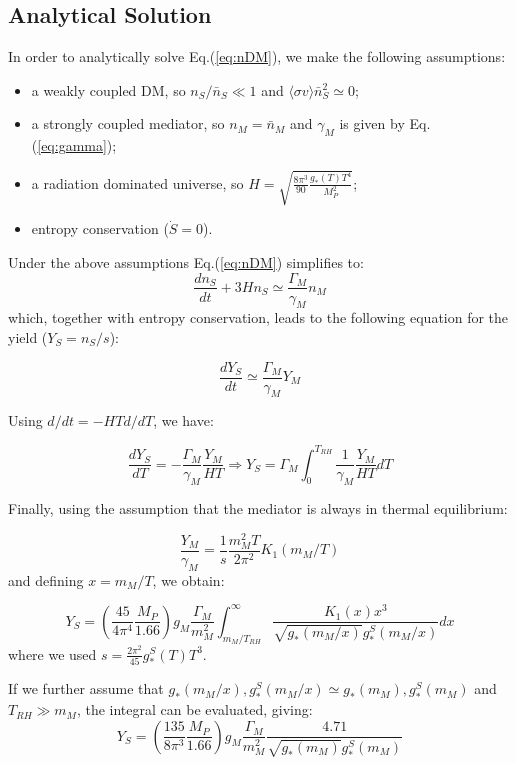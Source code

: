 \documentclass{article}
\def\bi{\begin{itemize}}
\def\ei{\end{itemize}}
\def\be{\begin{equation}}
\def\ee{\end{equation}}
\newcommand\Drv[2]{\frac{d #1}{d #2}}
\begin{document}
\subsection{Analytical Solution} \label{sec:analytic}

In order to analytically solve Eq.(\ref{eq:nDM}), we make the following assumptions:
\bi
\item a  weakly coupled DM, so $n_S/\bar{n}_S \ll 1$ and  $\langle \sigma v \rangle \bar{n}_S^2 \simeq 0$;
\item a strongly coupled mediator, so $n_M = \bar{n}_M$ and $\gamma_M$ is given by Eq.(\ref{eq:gamma});
\item a radiation dominated universe, so $H=\sqrt{\frac{8 \pi^3}{90}\frac{g_*(T) T^4}{M_P^2}}$;
\item entropy conservation ($\dot{S} = 0$).
\ei

Under the above assumptions Eq.(\ref{eq:nDM}) simplifies to:
\be
\Drv{n_{S}}{t} + 3H n_S  \simeq  \frac{\Gamma_M}{\gamma_M}  n_M
\ee
which, together with entropy conservation, leads to the following equation for the yield ($Y_S = n_S/s$):

\be
\Drv{Y_{S}}{t}  \simeq  \frac{\Gamma_M}{\gamma_M}  Y_M
\ee

Using $d/dt = -H T d/dT$, we have:

\be
\Drv{Y_S}{T} = -\frac{\Gamma_M}{\gamma_M}  \frac{Y_M}{H T} \Rightarrow Y_S = \Gamma_M   \int^{T_{RH}}_{0} \frac{1}{\gamma_M} \frac{Y_M}{H T} dT
\ee

Finally, using the assumption that the mediator is always in thermal equilibrium:

\be
\frac{Y_M}{\gamma_M} = \frac{1}{s} \frac{m_M^2 T}{2\pi^2} K_1\left(m_M/T\right)
\ee
and defining $x=m_M/T$, we obtain:

\be
Y_S = \left(\frac{45}{4 \pi^4} \frac{M_P}{1.66}\right)  g_M \frac{\Gamma_M}{m_M^2}   \int_{m_M/T_{RH}}^{\infty}  \frac{K_1(x) x^3}{\sqrt{g_*(m_M/x)} g_*^{S}(m_M/x)} dx
\label{eq:Yana}
\ee
where we used $s = \frac{2 \pi^2}{45} g_*^{S}(T) T^3$.

If we further assume that $g_*(m_M/x), g_*^{S}(m_M/x) \simeq g_*(m_M), g_*^{S}(m_M)$ and $T_{RH} \gg m_M$, the integral
can be evaluated, giving:
\be
Y_S = \left(\frac{135}{8 \pi^3} \frac{M_P}{1.66}\right)  g_M \frac{\Gamma_M}{m_M^2} \frac{4.71}{\sqrt{g_*(m_M)} g_*^{S}(m_M)}
\ee
\end{document}
